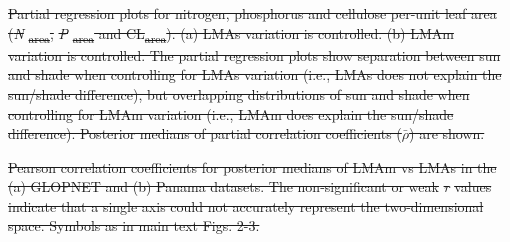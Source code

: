 \documentclass[
  12pt,
  letterpaper,
  DIV=11,
  numbers=noendperiod]{scrartcl}
\numberwithin{equation}{section} %
\providecommand{\DIFdel}[1]{{\protect\color{red}\sout{#1}}}                      %
\begin{document}





{%
\DIFdel{Partial regression plots for
nitrogen, phosphorus and cellulose per-unit leaf area
(}\emph{\DIFdel{N}}%
\DIFdel{\textsubscript{area}, }\emph{\DIFdel{P}}%
\DIFdel{\textsubscript{area} and
CL\textsubscript{area}). (a) LMAs variation is controlled. (b) LMAm
variation is controlled. The partial regression plots show separation
between sun and shade when controlling for LMAs variation (i.e., LMAs
does not explain the sun/shade difference), but overlapping
distributions of sun and shade when controlling for LMAm variation
(i.e., LMAm does explain the sun/shade difference). Posterior medians of
partial correlation coefficients (\(\bar{\rho}\)) are shown.}}







{%
\DIFdel{Pearson correlation coefficients for
posterior medians of LMAm vs LMAs in the (a) GLOPNET and (b) Panama
datasets. The non-significant or weak }\emph{\DIFdel{r}} %
\DIFdel{values indicate that a
single axis could not accurately represent the two-dimensional space.
Symbols as in main text Figs. 2-3.}}



\end{document}
